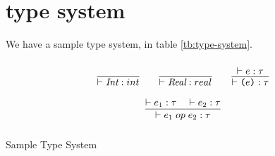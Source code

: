 \section{type system}

We have a sample type system, in table \ref{tb:type-system}.

\begin{table}[h]
    \centering
    \[
    \arraycolsep=1em
    \def\arraystretch{2.5}
    \begin{array}{c}
            \begin{array}{ccc}
            \infer
                {\vdash \textit{Int} : int}
                {\;}

            &
            \infer
                {\vdash \textit{Real} : real}
                {\;}
            & 
            \infer 
                {\vdash \texttt{(}e\texttt{)}:\tau}
                {\vdash e:\tau}
        \end{array}
        \\
        \begin{array}{c}
            \infer
                {\vdash e_1\;op\;e_2 : \tau}
                {\vdash e_1:\tau\quad \vdash e_2:\tau}
        \end{array}
    \end{array}
    \]
    \caption{Sample Type System}
    \label{tb:type-system}
\end{table}